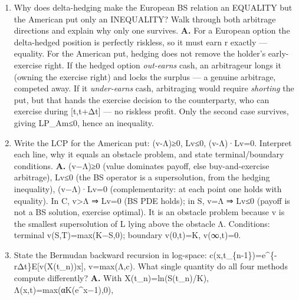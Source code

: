 \documentclass[
  11pt,
]{article}
\begin{document}
\begin{enumerate}
  optimal? Use parity P\^{}eur = Ke\^{}\{-r(T-t)\} - S + C\^{}eur and
  Ke\^{}\{-r(T-t)\} \textless{} K. What is the economic intuition?
  \textbf{A.} Parity gives
  P\textsuperscript{eur=Ke}\{−r(T−t)\}−S+C\^{}eur, and
  Ke\^{}\{−r(T−t)\}\textless K, so the live put can be worth \emph{less}
  than its intrinsic K−S. When that happens, exercising now and banking
  the full K to earn interest beats holding --- early exercise is
  strictly optimal, so there is no European--American equivalence.
  Intuition: the put holder \emph{wants the strike cash K early} to earn
  interest, whereas the call holder wants to \emph{defer paying K} ---
  the asymmetry is entirely the sign of the strike cash flow.
\item
  Why does delta-hedging make the European BS relation an EQUALITY but
  the American put only an INEQUALITY? Walk through both arbitrage
  directions and explain why only one survives. \textbf{A.} For a
  European option the delta-hedged position is perfectly riskless, so it
  must earn r exactly --- equality. For the American put, hedging does
  not remove the holder's early-exercise right. If the hedged option
  \emph{out-earns} cash, an arbitrageur longs it (owning the exercise
  right) and locks the surplus --- a genuine arbitrage, competed away.
  If it \emph{under-earns} cash, arbitraging would require
  \emph{shorting} the put, but that hands the exercise decision to the
  counterparty, who can exercise during {[}t,t+Δt{]} --- no riskless
  profit. Only the second case survives, giving LP\_Am≤0, hence an
  inequality.
\item
  Write the LCP for the American put: (v-Λ)≥0, Lv≤0, (v-Λ)·Lv=0.
  Interpret each line, why it equals an obstacle problem, and state
  terminal/boundary conditions. \textbf{A.} (v−Λ)≥0 (value dominates
  payoff, else buy-and-exercise arbitrage), Lv≤0 (the BS operator is a
  supersolution, from the hedging inequality), (v−Λ)·Lv=0
  (complementarity: at each point one holds with equality). In C,
  v\textgreater Λ ⇒ Lv=0 (BS PDE holds); in S, v=Λ ⇒ Lv≤0 (payoff is not
  a BS solution, exercise optimal). It is an obstacle problem because v
  is the smallest supersolution of L lying above the obstacle Λ.
  Conditions: terminal v(S,T)=max(K−S,0); boundary v(0,t)=K, v(∞,t)=0.
\item
  State the Bermudan backward recursion in log-space:
  c(x,t\_\{n-1\})=e\^{}\{-rΔt\}E{[}v(X(t\_n))\textbar x{]}, v=max(Λ,c).
  What single quantity do all four methods compute differently?
  \textbf{A.} With X(t\_n)=ln(S(t\_n)/K), Λ(x,t)=max(αK(e\^{}x−1),0),

\end{enumerate}
\end{document}
